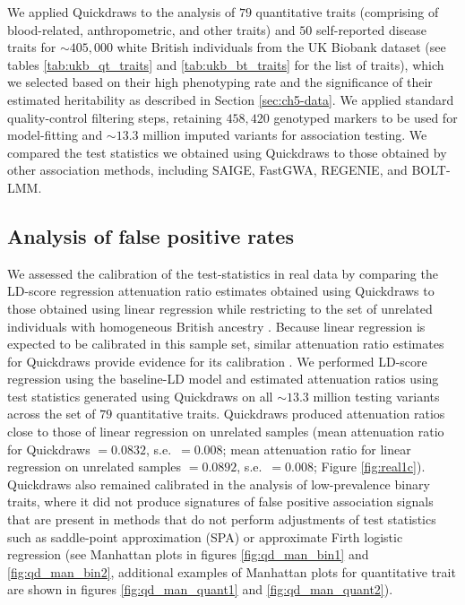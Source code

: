 We applied Quickdraws to the analysis of $79$ quantitative traits (comprising of blood-related, anthropometric, and other traits) and $50$ self-reported disease traits for ${\sim}405{,}000$ white British individuals from the UK Biobank dataset (see tables \ref{tab:ukb_qt_traits} and \ref{tab:ukb_bt_traits} for the list of traits), which we selected based on their high phenotyping rate and the significance of their estimated heritability as described in Section \ref{sec:ch5-data}.
%
We applied standard quality-control filtering steps, retaining $458{,}420$ genotyped markers to be used for model-fitting and ${\sim}13.3$ million imputed variants for association testing.
%
We compared the test statistics we obtained using Quickdraws to those obtained by other association methods, including SAIGE, FastGWA, REGENIE, and BOLT-LMM.
%

\subsection{Analysis of false positive rates}
%
We assessed the calibration of the test-statistics in real data by comparing the LD-score regression attenuation ratio estimates \cite{loh2018mixed} obtained using Quickdraws to those obtained using linear regression while restricting to the set of unrelated individuals with homogeneous British ancestry \cite{bycroft2018uk}.
%
Because linear regression is expected to be calibrated in this sample set, similar attenuation ratio estimates for Quickdraws provide evidence for its calibration \cite{loh2018mixed,jiang2019resource}.
%
We performed LD-score regression using the baseline-LD model \cite{gazal2017linkage} and estimated attenuation ratios using test statistics generated using Quickdraws on all ${\sim}13.3$ million testing variants across the set of $79$ quantitative traits.
%
Quickdraws produced attenuation ratios close to those of linear regression on unrelated samples (mean attenuation ratio for Quickdraws $ = 0.0832$, s.e.\ $= 0.008$; mean attenuation ratio for linear regression on unrelated samples $= 0.0892$, s.e.\ $= 0.008$; Figure \ref{fig:real1c}). 
%
Quickdraws also remained calibrated in the analysis of low-prevalence binary traits, where it did not produce signatures of false positive association signals that are present in methods that do not perform adjustments of test statistics such as saddle-point approximation (SPA) \cite{zhou2018efficiently} or approximate Firth logistic regression \cite{mbatchou2021computationally} (see Manhattan plots in figures \ref{fig:qd_man_bin1} and \ref{fig:qd_man_bin2}, additional examples of Manhattan plots for quantitative trait are shown in figures \ref{fig:qd_man_quant1} and  \ref{fig:qd_man_quant2}).
%

